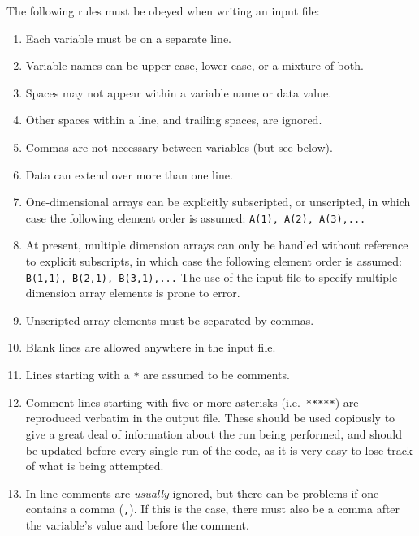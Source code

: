 \documentclass[11pt,a4paper]{report}
\begin{document}
The following rules must be obeyed when writing an input file:

\begin{enumerate}

\item Each variable must be on a separate line.

\item Variable names can be upper case, lower case, or a mixture of both.

\item Spaces may not appear within a variable name or data value.

\item Other spaces within a line, and trailing spaces, are ignored.

\item Commas are not necessary between variables (but see below).

\item Data can extend over more than one line.

\item One-dimensional arrays can be explicitly subscripted, or unscripted, in
  which case the following element order is assumed: \texttt{A(1), A(2),
    A(3),...}

\item At present, multiple dimension arrays can only be handled without
  reference to explicit subscripts, in which case the following element order
  is assumed: \texttt{B(1,1), B(2,1), B(3,1),...} The use of the input file to
  specify multiple dimension array elements is prone to error.

\item Unscripted array elements must be separated by commas.

\item Blank lines are allowed anywhere in the input file.

\item Lines starting with a \texttt{*} are assumed to be comments.

\item Comment lines starting with five or more asterisks (i.e.\
  \texttt{*****}) are reproduced verbatim in the output file. These should be
  used copiously to give a great deal of information about the run being
  performed, and should be updated before every single run of the code, as it
  is very easy to lose track of what is being attempted.

\item In-line comments are \textit{usually}\/ ignored, but there can be
  problems if one contains a comma (\texttt{,}). If this is the case, there
  must also be a comma after the variable's value and before the comment.

\end{enumerate}
\end{document}
